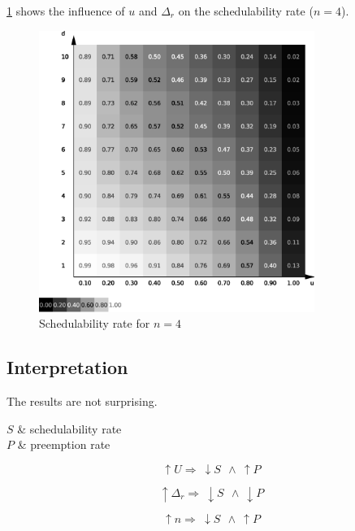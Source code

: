 \documentclass[a4paper,12pt]{article}
\begin{document}
\ref{fig:stu:4s} shows the influence of $u$ and $\Delta_r$ on the schedulability rate ($n = 4$).

\begin{figure}
	\centering
	\includegraphics[width=0.8\textwidth]{../mean/eps/4s}
	\caption{\label{fig:stu:4s} Schedulability rate for $n = 4$}
\end{figure}

\subsection{Interpretation}

The results are not surprising.

\begin{conditions}
	$S$ & schedulability rate\\
	$P$ & preemption rate
\end{conditions}

\begin{equation}
	\uparrow U \Rightarrow ~\downarrow S ~~\land ~\uparrow P
	\label{eq:U influence}
\end{equation}

\begin{equation}
	\uparrow \Delta_r \Rightarrow ~\downarrow S ~~\land ~\downarrow P
	\label{eq:d influence}
\end{equation}

\begin{equation}
	\uparrow n \Rightarrow ~\downarrow S ~~\land ~\uparrow P
	\label{eq:n influence}
\end{equation}
	
\end{document}
